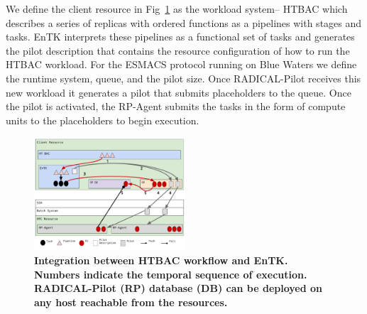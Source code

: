 We define the client resource in Fig~\ref{figure:ht-bac_rp} as the workload system-- HTBAC which describes a series of replicas with ordered functions as a pipelines with stages and tasks. EnTK interprets these pipelines as a functional set of tasks and generates the pilot description that contains the resource configuration of how to run the HTBAC workload. For the ESMACS protocol running on Blue Waters we define the runtime system, queue, and the pilot size. Once RADICAL-Pilot receives this new workload it generates a pilot that submits placeholders to the queue. Once the pilot is activated, the RP-Agent submits the tasks in the form of compute units to the placeholders to begin execution.  

\begin{figure}[ht]
\centering
  \includegraphics[width=0.5\textwidth]{FIGURES/ht-bac-rp_integration.pdf}
  \caption{\bf Integration between HTBAC workflow and EnTK. Numbers indicate the temporal sequence of execution. RADICAL-Pilot (RP) database (DB) can be deployed on any host reachable from the resources.}
   \label{figure:ht-bac_rp}
\end{figure}


